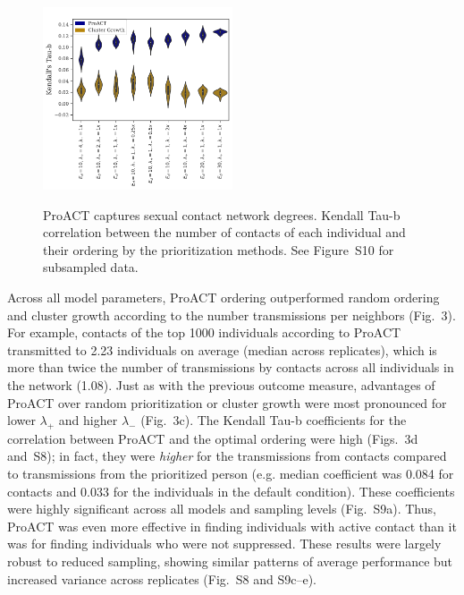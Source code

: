 \documentclass[oupdraft]{sysbio}
\begin{document}
\begin{figure}[!tp]
\centering
{\footnotesize
\includegraphics[width=0.5\textwidth]{figs/Fig4.pdf}%
\\
}
\caption{ProACT captures sexual contact network degrees.
 Kendall Tau-b correlation between the number of contacts of each individual and their ordering by the prioritization methods.
 See Figure~S10 for subsampled data. 
 }
\label{fig:efficacy-conc}
\end{figure}

Across all model parameters, ProACT ordering outperformed random ordering and cluster growth according to the number transmissions per neighbors (Fig.~3).
For example, contacts of the top 1000 individuals according to ProACT transmitted to 2.23 individuals on average (median across replicates), which is more than twice the number of transmissions by contacts across all individuals in the network (1.08).
Just as with the previous outcome measure, advantages of ProACT over random prioritization or cluster growth were most pronounced for lower $\lambda_{+}$ and higher $\lambda_{-}$ (Fig.~3c). 
The Kendall Tau-b coefficients for the correlation between ProACT and the optimal ordering were high (Figs.~3d and~S8); in fact, they were \textit{higher} for the transmissions from contacts compared to transmissions from the prioritized person (e.g. median coefficient was 0.084 for contacts and 0.033 for the individuals in the default condition). 
These coefficients were highly significant across all models and sampling levels (Fig.~S9a).
Thus, ProACT was even more effective in finding individuals with active contact than it was for finding individuals who were not suppressed. 
These results were largely robust to reduced sampling, showing similar patterns of average performance but increased variance across replicates (Fig.~S8 and S9c--e).
\end{document}
